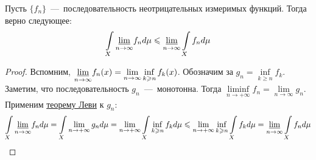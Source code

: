 \begin{theorem}[Фату]
    Пусть $\{f_n\}$~---~последовательность неотрицательных измеримых функций. Тогда верно следующее: \[\int\limits_X   \underset{n \rightarrow \infty}{\underline{\lim}} f_nd\mu \leqslant \underset{n \rightarrow \infty}{\underline{\lim}} \int\limits_{X} f_nd\mu\]
\end{theorem}
\begin{proof}
    Вспомним, $\underset{n \rightarrow \infty}{\underline{\lim}} f_n(x) = \lim\limits_{n \rightarrow \infty} \inf\limits_{k\geqslant n} f_k(x)$. Обозначим за $g_n = \inf\limits_{k \geq n} f_k$. Заметим, что последовательность $g_n$~---~монотонна. Тогда $\liminf\limits_{n \rightarrow +\infty} f_n = \lim\limits_{n \rightarrow \infty} g_n$. Применим \hyperlink{beppo_levi}{теорему Леви} к $g_n$: \[\int\limits_X \underset{n \rightarrow \infty}{\underline{\lim}} f_n d\mu =  \int\limits_X \lim\limits_{n \rightarrow +\infty} g_nd\mu = \lim\limits_{n\rightarrow +\infty} \int\limits_X \inf\limits_{k \geqslant n} f_k d\mu \leqslant \lim\limits_{n\rightarrow +\infty}\inf\limits_{k \geqslant n} \int\limits_X f_k d\mu = \underset{n \rightarrow \infty}{\underline{\lim}} \int\limits_X f_nd\mu\]
\end{proof}

